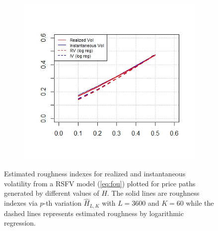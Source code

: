 \documentclass{article}
\begin{document}
\begin{figure}[htbp]
    \centering
    
    \begin{subfigure}{0.78\textwidth}
        \includegraphics[width=\linewidth]{rsfv_single.jpeg}
    \end{subfigure}
    
    \caption{Estimated roughness indexes for realized and instantaneous volatility from a RSFV model (\ref{eq:fou}) plotted for price paths generated by different values of $H$. The solid lines are roughness indexes via $p$-th variation $\hat{H}_{L,K}$ with $L = 3600$ and $K= 60$ while the dashed lines represents estimated roughness by logarithmic regression.}
    \label{fig:rsfv_single}
\end{figure}\\\\
\end{document}
